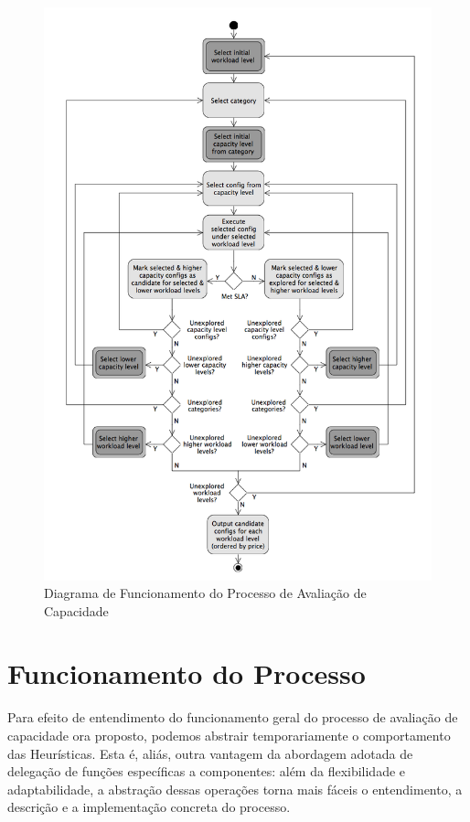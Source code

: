 \begin{figure}
  \caption{\label{fig:fig_processo_aval_capacidade}Diagrama de Funcionamento do Processo de Avaliação de Capacidade}
  \begin{center}
    \includegraphics[scale=0.45]{img/capacity-planning-diagram-v13-mono}
  \end{center}
\end{figure}

\section{Funcionamento do Processo}
\label{sec:funcionamento_processo}
Para efeito de entendimento do funcionamento geral do processo de avaliação de 
capacidade ora proposto, podemos abstrair temporariamente o comportamento das 
Heurísticas. Esta é, aliás, outra vantagem da abordagem adotada de 
delegação de funções específicas a componentes: além da flexibilidade e 
adaptabilidade, a abstração dessas operações torna mais fáceis o entendimento, 
a descrição e a implementação concreta do processo.   

